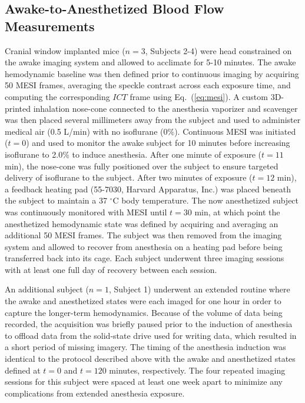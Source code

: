 \documentclass[12pt]{spieman}
\begin{document}
\begin{spacing}{2}

\subsection{Awake-to-Anesthetized Blood Flow Measurements}

Cranial window implanted mice ($n = 3$, Subjects 2-4) were head constrained on the awake imaging system and allowed to acclimate for 5-10 minutes. The awake hemodynamic baseline was then defined prior to continuous imaging by acquiring 50 MESI frames, averaging the speckle contrast across each exposure time, and computing the corresponding $ICT$ frame using Eq.~(\ref{eq:mesi}). A custom 3D-printed inhalation nose-cone connected to the anesthesia vaporizer and scavenger was then placed several millimeters away from the subject and used to administer medical air (0.5 L/min) with no isoflurane (0\%). Continuous MESI was initiated ($t = 0$) and used to monitor the awake subject for 10 minutes before increasing isoflurane to 2.0\% to induce anesthesia. After one minute of exposure ($t = 11$ min), the nose-cone was fully positioned over the subject to ensure targeted delivery of isoflurane to the subject. After two minutes of exposure ($t = 12$ min), a feedback heating pad (55-7030, Harvard Apparatus, Inc.) was placed beneath the subject to maintain a 37 $^\circ$C body temperature. The now anesthetized subject was continuously monitored with MESI until $t = 30$ min, at which point the anesthetized hemodynamic state was defined by acquiring and averaging an additional 50 MESI frames. The subject was then removed from the imaging system and allowed to recover from anesthesia on a heating pad before being transferred back into its cage. Each subject underwent three imaging sessions with at least one full day of recovery between each session.

An additional subject ($n = 1$, Subject 1) underwent an extended routine where the awake and anesthetized states were each imaged for one hour in order to capture the longer-term hemodynamics. Because of the volume of data being recorded, the acquisition was briefly paused prior to the induction of anesthesia to offload data from the solid-state drive used for writing data, which resulted in a short period of missing imagery. The timing of the anesthesia induction was identical to the protocol described above with the awake and anesthetized states defined at $t = 0$ and $t = 120$ minutes, respectively. The four repeated imaging sessions for this subject were spaced at least one week apart to minimize any complications from extended anesthesia exposure.


\end{spacing}
\end{document}
